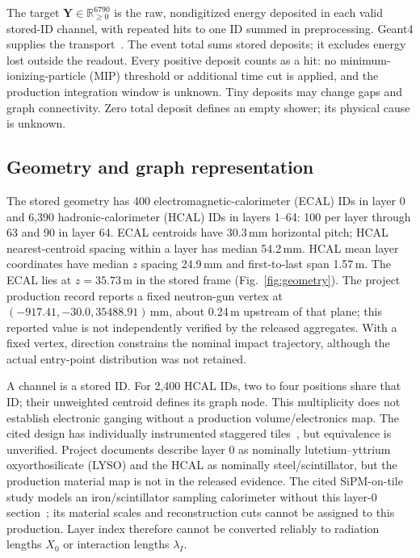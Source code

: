 \documentclass[10pt]{article}
\newcommand{\Y}{\mathbf{Y}}
\begin{document}
The target $\Y\in\mathbb R_{\geq0}^{6790}$ is the raw, nondigitized energy deposited in each valid stored-ID channel, with repeated hits to one ID summed in preprocessing. Geant4 supplies the transport~\cite{geant4}. The event total sums stored deposits; it excludes energy lost outside the readout. Every positive deposit counts as a hit: no minimum-ionizing-particle (MIP) threshold or additional time cut is applied, and the production integration window is unknown. Tiny deposits may change gaps and graph connectivity. Zero total deposit defines an empty shower; its physical cause is unknown.

\subsection{Geometry and graph representation}

The stored geometry has 400 electromagnetic-calorimeter (ECAL) IDs in layer 0 and 6,390 hadronic-calorimeter (HCAL) IDs in layers 1--64: 100 per layer through 63 and 90 in layer 64. ECAL centroids have 30.3\,mm horizontal pitch; HCAL nearest-centroid spacing within a layer has median 54.2\,mm. HCAL mean layer coordinates have median $z$ spacing 24.9\,mm and first-to-last span 1.57\,m. The ECAL lies at $z=35.73$\,m in the stored frame (Fig.~\ref{fig:geometry}). The project production record reports a fixed neutron-gun vertex at $(-917.41,-30.0,35488.91)$\,mm, about 0.24\,m upstream of that plane; this reported value is not independently verified by the released aggregates. With a fixed vertex, direction constrains the nominal impact trajectory, although the actual entry-point distribution was not retained.

A channel is a stored ID. For 2,400 HCAL IDs, two to four positions share that ID; their unweighted centroid defines its graph node. This multiplicity does not establish electronic ganging without a production volume/electronics map. The cited design has individually instrumented staggered tiles~\cite{epiczdc,hexplit}, but equivalence is unverified. Project documents describe layer 0 as nominally lutetium--yttrium oxyorthosilicate (LYSO) and the HCAL as nominally steel/scintillator, but the production material map is not in the released evidence. The cited SiPM-on-tile study models an iron/scintillator sampling calorimeter without this layer-0 section~\cite{epiczdc}; its material scales and reconstruction cuts cannot be assigned to this production. Layer index therefore cannot be converted reliably to radiation lengths $X_0$ or interaction lengths $\lambda_I$.
\end{document}
